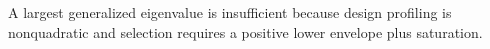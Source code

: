 A largest generalized eigenvalue is insufficient because design profiling is nonquadratic and selection requires a positive lower envelope plus saturation.